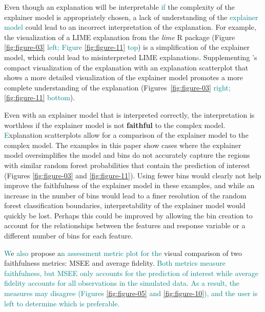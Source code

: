 \documentclass[AMS,STIX2COL]{WileyNJD-v2}\usepackage[]{graphicx}\usepackage[]{color}
\newcommand{\kge}[1]{\textcolor{teal}{#1}}
\renewcommand{\sout}[1]{\unskip}
\begin{document}
Even though an explanation will be interpretable \kge{if} \sout{as long as} the complexity of the explainer model is appropriately chosen, a lack of understanding of the \kge{explainer model} \sout{process used to create the explanation} could lead to an incorrect interpretation of the explanation. For example, the visualization of a LIME explanation \sout{available} from the \emph{lime} R package \citep{pedersen:2020} (\sout{shown in }Figure\sout{s} \ref{fig:figure-03} \kge{left; } \sout{and} \kge{Figure} \ref{fig:figure-11} \kge{top}) is a \sout{major} simplification of the explainer model, which could lead to \sout{under-interpreted or} misinterpreted LIME explanation\kge{s}. Supplementing \citet{pedersen:2020}'s compact visualization of the explanation with an explanation scatterplot that shows a more detailed visualization of the explainer model promotes a more complete understanding of the explanation (\sout{such as }Figures~\ref{fig:figure-03} \kge{right; } \sout{and} \ref{fig:figure-11} \kge{bottom}).

Even with an explainer model that is interpreted correctly, the interpretation is worthless if the explainer model is not \textbf{faithful} to the complex model. \sout{This claim can be assessed using the diagnostic plots suggested in this paper. Many of the visualizations in this paper highlight problems with the faithfulness of the explainer models. The e} \kge{E}xplanation scatterplots allow for a comparison of the explainer model to the complex model. The examples in this paper show cases where the explainer model oversimplifies the model and bins do not accurately capture the regions with similar random forest probabilities that contain the prediction of interest (Figures \ref{fig:figure-03} and \ref{fig:figure-11}). Using fewer bins would clearly not help improve the faithfulness of the explainer model in these examples, and while an increase in the number of bins would lead to a finer resolution of the random forest classification boundaries, interpretability of the explainer model would quickly be lost. Perhaps this could be improved by allowing the bin creation to account for the relationships between the features and response variable or a different number of bins for each feature.

\sout{In addition to assessing faithfulness by visually comparing the complex and explainer model, w}\kge{W}e \kge{also} propose a\kge{n assessment metric plot for the} visual comparison of two faithfulness metrics: MSEE and average fidelity. \kge{Both metrics measure faithfulness, but MSEE only accounts for the prediction of interest while average fidelity accounts for all observations in the simulated data. As a result, the measures may disagree (Figures \ref{fig:figure-05} and \ref{fig:figure-10}), and the user is left to determine which is preferable.} \sout{The examples of faithfulness metric comparisons in this paper both produced conflicting results (Figures \ref{fig:figure-05} and \ref{fig:figure-10}). This makes it difficult to decide on a recommendation of a set of tuning parameter values that produce the explanations with the most faithful explainer model.}
\end{document}
